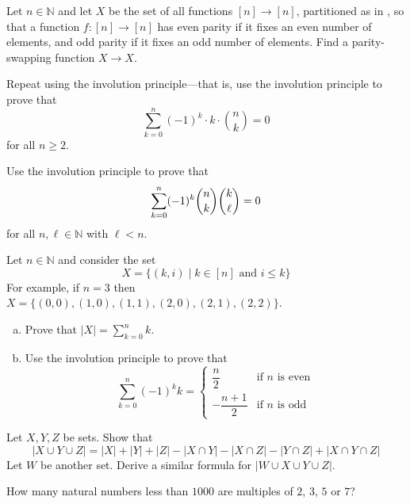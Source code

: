 \begin{exercise}
Let $n \in \mathbb{N}$ and let $X$ be the set of all functions $[n] \to [n]$, partitioned as in , so that a function $f : [n] \to [n]$ has even parity if it fixes an even number of elements, and odd parity if it fixes an odd number of elements. Find a parity-swapping function $X \to X$.
\end{exercise}


\begin{exercise}
Repeat  using the involution principle---that is, use the involution principle to prove that
\[ \sum_{k=0}^n (-1)^k \cdot k \cdot \binom{n}{k} = 0 \]
for all $n \ge 2$.
\end{exercise}

\begin{exercise}
Use the involution principle to prove that
\[ \sum_{k=0}^n (-1)^k \dbinom{n}{k} \dbinom{k}{\ell} = 0 \]
for all $n,\ell \in \mathbb{N}$ with $\ell < n$.
\end{exercise}


\begin{exercise}
Let $n \in \mathbb{N}$ and consider the set
\[ X = \{ (k,i) \mid k \in [n] \text{ and } i \le k \} \]
For example, if $n=3$ then $X = \{ (0,0), (1,0), (1,1), (2,0), (2,1), (2,2) \}$.

\begin{enumerate}[(a)]
\item Prove that $|X| = \displaystyle \sum_{k=0}^n k$.
\item Use the involution principle to prove that
\[ \sum_{k=0}^n (-1)^k k = \begin{cases} \dfrac{n}{2} & \text{if $n$ is even} \\ -\dfrac{n+1}{2} & \text{if $n$ is odd } \end{cases} \]
\end{enumerate}
\end{exercise}

\begin{exercise}
\label{exSizeOfUnionOf3Or4Sets}
Let $X,Y,Z$ be sets. Show that
\[ |X \cup Y \cup Z| = |X| + |Y| + |Z| - |X \cap Y| - |X \cap Z| - |Y \cap Z| + |X \cap Y \cap Z| \]
Let $W$ be another set. Derive a similar formula for $|W \cup X \cup Y \cup Z|$.
\end{exercise}


\begin{exercise}
How many natural numbers less than $1000$ are multiples of $2$, $3$, $5$ or $7$?
\end{exercise}

